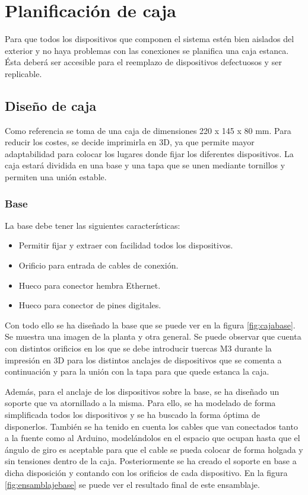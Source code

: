 \chapter{Planificación de caja}\label{chp-04}

Para que todos los dispositivos que componen el sistema estén bien aislados del exterior
y no haya problemas con las conexiones se planifica una caja estanca. Ésta deberá ser 
accesible para el reemplazo de dispositivos defectuosos y ser replicable. 

\section{Diseño de caja}

Como referencia se toma de una caja de dimensiones 220 x 145 x 80 mm. Para reducir los 
costes, se decide imprimirla en 3D, ya que permite mayor adaptabilidad para colocar 
los lugares donde fijar los diferentes dispositivos. La caja estará dividida en una base y una 
tapa que se unen mediante tornillos y permiten una unión estable.

\subsection{Base}

La base debe tener las siguientes características:
\begin{itemize}
    \item Permitir fijar y extraer con facilidad todos los dispositivos. 
    \item Orificio para entrada de cables de conexión.
    \item Hueco para conector hembra Ethernet.
    \item Hueco para conector de pines digitales.
\end{itemize} 

Con todo ello se ha diseñado la base que se puede ver en la figura \ref{fig:cajabase}. Se muestra
una imagen de la planta y otra general. Se puede observar que cuenta con distintos orificios en los
que se debe introducir tuercas M3 durante la impresión en 3D para los distintos anclajes de dispositivos
que se comenta a continuación y para la unión con la tapa para que quede estanca la caja.

Además, para el anclaje de los dispositivos sobre la base, se ha diseñado un soporte que va atornillado
a la misma. Para ello, se ha modelado de forma simplificada todos los dispositivos y se ha buscado la 
forma óptima de disponerlos. También se ha tenido en cuenta los cables que van conectados tanto a la 
fuente como al Arduino, modelándolos en el espacio que ocupan hasta que el ángulo de giro es aceptable
para que el cable se pueda colocar de forma holgada y sin tensiones dentro de la caja.
Posteriormente se ha creado el soporte en base a dicha disposición y contando con los orificios de cada
dispositivo. En la figura \ref{fig:ensamblajebase} se puede ver el resultado final de este ensamblaje.

